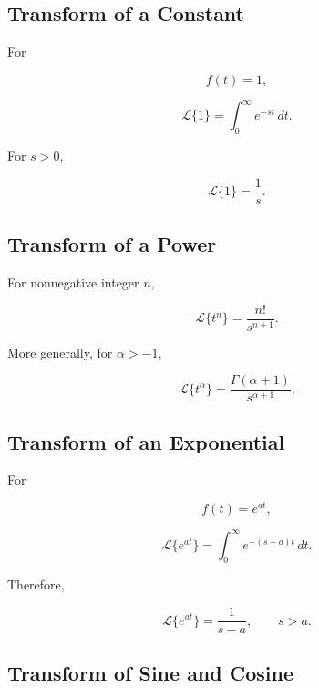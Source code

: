 \subsection{Transform of a Constant}
\label{subsec:laplace-constant}

For

\[
f(t)=1,
\]

\[
\mathcal{L}\{1\}
=
\int_0^\infty
e^{-st}\,dt.
\]

For \(s>0\),

\[
\boxed{
\mathcal{L}\{1\}
=
\frac1s.
}
\]

\subsection{Transform of a Power}
\label{subsec:laplace-power}

For nonnegative integer \(n\),

\[
\boxed{
\mathcal{L}\{t^n\}
=
\frac{n!}{s^{n+1}}.
}
\]

More generally, for \(\alpha>-1\),

\[
\boxed{
\mathcal{L}\{t^\alpha\}
=
\frac{
\Gamma(\alpha+1)
}{
s^{\alpha+1}
}.
}
\]

\subsection{Transform of an Exponential}
\label{subsec:laplace-exponential}

For

\[
f(t)=e^{at},
\]

\[
\mathcal{L}\{e^{at}\}
=
\int_0^\infty
e^{-(s-a)t}\,dt.
\]

Therefore,

\[
\boxed{
\mathcal{L}\{e^{at}\}
=
\frac1{s-a},
\qquad
s>a.
}
\]

\subsection{Transform of Sine and Cosine}
\label{subsec:laplace-trigonometric}

